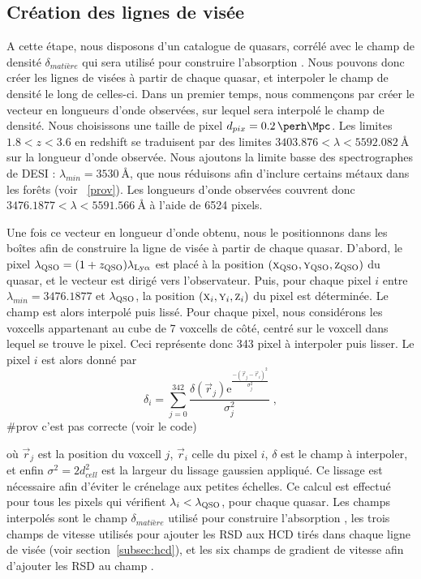 \documentclass[11pt, twoside, a4paper, openright]{report}
\begin{document}
\subsection{Création des lignes de visée}
\label{subsec:los_interp}
A cette étape, nous disposons d'un catalogue de quasars, corrélé avec le champ de densité $\delta_{matière}$ qui sera utilisé pour construire l'absorption \lya{}. Nous pouvons donc créer les lignes de visées à partir de chaque quasar, et interpoler le champ de densité le long de celles-ci.
Dans un premier temps, nous commençons par créer le vecteur en longueurs d'onde observées, sur lequel sera interpolé le champ de densité. Nous choisissons une taille de pixel $d_{pix} = \SI{0.2}{\perh\Mpc}$. Les limites $\num{1.8} < z < \num{3.6}$ en redshift se traduisent par des limites $\num{3403.876} < \lambda < \SI{5592.082}{\angstrom}$ sur la longueur d'onde observée. Nous ajoutons la limite basse des spectrographes de DESI : $\lambda_{min} = \SI{3530}{\angstrom}$, que nous réduisons afin d'inclure certains métaux dans les forêts (voir ~\ref{prov}). Les longueurs d'onde observées couvrent donc $\num{3476.1877} < \lambda < \SI{5591.566}{\angstrom}$ à l'aide de \num{6524} pixels.

Une fois ce vecteur en longueur d'onde obtenu, nous le positionnons dans les boîtes afin de construire la ligne de visée à partir de chaque quasar.
D'abord, le pixel $\lambda_{\textsc{QSO}} = (1+z_{\textsc{QSO}}) \lambda_{\mathrm{Ly}\alpha}$ est placé à la position $(\textsc{x}_{\textsc{QSO}}, \textsc{y}_{\textsc{QSO}}, \textsc{z}_{\textsc{QSO}})$ du quasar, et le vecteur est dirigé vers l'observateur. Puis, pour chaque pixel $i$ entre $\lambda_{min} = \num{3476.1877}$ et $\lambda_{\textsc{QSO}}$, la position $(\textsc{x}_i, \textsc{y}_i, \textsc{z}_i)$ du pixel est déterminée.
Le champ est alors interpolé puis lissé. Pour chaque pixel, nous considérons les voxcells appartenant au cube de 7 voxcells de côté, centré sur le voxcell dans lequel se trouve le pixel. Ceci représente donc \num{343} pixel à interpoler puis lisser.
Le pixel $i$ est alors donné par
\begin{equation}
  \delta_i = \sum_{j=0}^{342}  \frac{\delta(\vec r_j) \mathrm{e}^{\frac{-(\vec r_j - \vec r_i)^2 }{ \sigma_j^2}}}{\sigma_j^2} \; ,
\end{equation}
\#prov c'est pas correcte (voir le code)

où $\vec r_j$ est la position du voxcell $j$, $\vec r_i$ celle du pixel $i$, $\delta$ est le champ à interpoler, et enfin $\sigma^2 = 2 d_{cell}^2$ est la largeur du lissage gaussien appliqué. Ce lissage est nécessaire afin d'éviter le crénelage aux petites échelles.
Ce calcul est effectué pour tous les pixels qui vérifient $\lambda_i < \lambda_{\textsc{QSO}}$, pour chaque quasar. Les champs interpolés sont le champ $\delta_{matière}$ utilisé pour construire l'absorption \lya{}, les trois champs de vitesse utilisés pour ajouter les RSD aux HCD tirés dans chaque ligne de visée (voir section~\ref{subsec:hcd}), et les six champs de gradient de vitesse afin d'ajouter les RSD au champ \lya{}.
\end{document}
